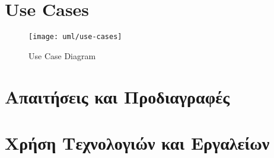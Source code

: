 

\section{Use Cases}




% 
% 




\begin{figure}
    \centering
    \texttt{[image: uml/use-cases]}
    \caption{Use Case Diagram}
\end{figure}

\section{Απαιτήσεις και Προδιαγραφές}

\section{Χρήση Τεχνολογιών και Εργαλείων}


